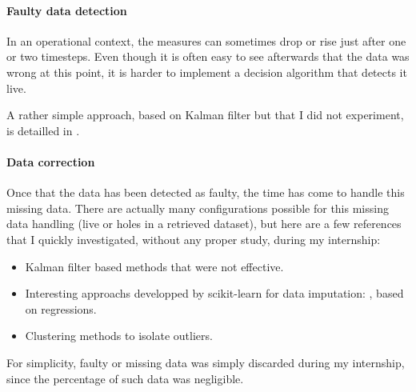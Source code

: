\paragraph{Faulty data detection}
\indent

In an operational context, the measures can sometimes drop or rise just after one or two timesteps. Even though it is often easy to see afterwards that the data was wrong at this point, it is harder to implement a decision algorithm that detects it live. 

A rather simple approach, based on Kalman filter but that I did not experiment, is detailled in \cite{kerhascoet_sensor_2017}.

\paragraph{Data correction}
\indent

Once that the data has been detected as faulty, the time has come to handle this missing data. There are actually many configurations possible for this missing data handling (live or holes in a retrieved dataset), but here are a few references that I quickly investigated, without any proper study, during my internship:

\begin{itemize}
    \item Kalman filter based methods that were not effective.
    \item Interesting approachs developped by scikit-learn for data imputation: \cite{sklearnmissingdata}, based on regressions.
    \item Clustering methods to isolate outliers.
\end{itemize}

For simplicity, faulty or missing data was simply discarded during my internship, since the percentage of such data was negligible.
